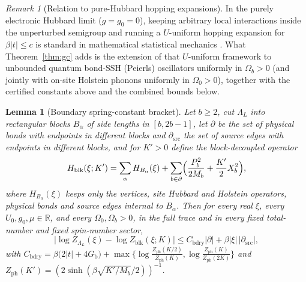 \documentclass[11pt]{article}
\newtheorem{lemma}[theorem]{Lemma}
\theoremstyle{definition}
\theoremstyle{remark}
\newtheorem{remark}[theorem]{Remark}
\newcommand{\R}{\mathbb{R}}
\newcommand{\Gb}{G_{\mathrm{b}}}
\begin{document}
\begin{remark}[Relation to pure-Hubbard hopping expansions]
\label{rem:uelschi}
In the purely electronic Hubbard limit ($g=g_0=0$), keeping arbitrary local
interactions inside the unperturbed semigroup and running a $U$-uniform hopping
expansion for $\beta|t|\le c$ is standard in mathematical statistical mechanics
\cite{uelschi1999,uelschi2004,frohlich2005}. What Theorem~\ref{thm:gc} adds is the
extension of that $U$-uniform framework to unbounded quantum bond-SSH (Peierls)
oscillators uniformly in $\Omega_b>0$ (and jointly with on-site Holstein phonons
uniformly in $\Omega_0>0$), together with the certified constants above and the
combined bounds below.
\end{remark}

\begin{lemma}[Boundary spring-constant bracket]
\label{lem:canon}
Let $b\ge2$, cut $\Lambda_L$ into rectangular blocks $B_\alpha$ of side lengths in
$[b,2b-1]$, let $\partial$ be the set of physical bonds with endpoints in different
blocks and $\partial_{\mathrm{src}}$ the set of source edges with endpoints in
different blocks, and for $K'>0$ define the block-decoupled operator
\[
H_{\mathrm{blk}}(\xi;K')=\sum_\alpha H_{B_\alpha}(\xi)
+\sum_{b\in\partial}\Bigl(\frac{P_b^2}{2M_b}+\frac{K'}{2}X_b^2\Bigr),
\]
where $H_{B_\alpha}(\xi)$ keeps only the vertices, site Hubbard and Holstein
operators, physical bonds and source edges internal to $B_\alpha$. Then for every
real $\xi$, every $U_0,g_0,\mu\in\R$, and every $\Omega_0,\Omega_b>0$, in the full
trace and in every fixed total-number and fixed spin-number sector,
\begin{equation}
\bigl|\log Z_{\Lambda_L}(\xi)-\log Z_{\mathrm{blk}}(\xi;K)\bigr|
\le C_{\mathrm{bdry}}|\partial|+\beta|\xi|\,|\partial_{\mathrm{src}}|,
\label{eq:bdry}
\end{equation}
with
$C_{\mathrm{bdry}}=\beta\bigl(2|t|+4\Gb\bigr)
+\max\bigl\{\log\frac{Z_{\mathrm{ph}}(K/2)}{Z_{\mathrm{ph}}(K)},
\log\frac{Z_{\mathrm{ph}}(K)}{Z_{\mathrm{ph}}(2K)}\bigr\}$ and
$Z_{\mathrm{ph}}(K')=(2\sinh(\beta\sqrt{K'/M_b}/2))^{-1}$.
\end{lemma}
\end{document}
